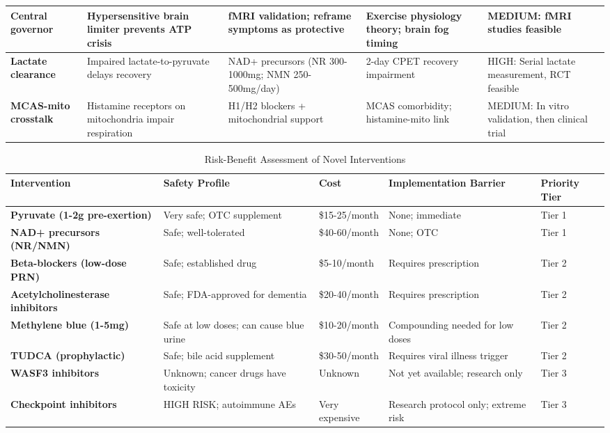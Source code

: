 \begin{table}[htbp]
\begin{tabular}{p{2.8cm}p{3cm}p{2.8cm}p{2.5cm}p{2.5cm}}
\midrule
\textbf{Central governor} & Hypersensitive brain limiter prevents ATP crisis & fMRI validation; reframe symptoms as protective & Exercise physiology theory; brain fog timing & MEDIUM: fMRI studies feasible \\
\midrule
\textbf{Lactate clearance} & Impaired lactate-to-pyruvate delays recovery & NAD+ precursors (NR 300-1000mg; NMN 250-500mg/day) & 2-day CPET recovery impairment & HIGH: Serial lactate measurement, RCT feasible \\
\midrule
\textbf{MCAS-mito crosstalk} & Histamine receptors on mitochondria impair respiration & H1/H2 blockers + mitochondrial support & MCAS comorbidity; histamine-mito link & MEDIUM: In vitro validation, then clinical trial \\
\bottomrule
\end{tabular}
\end{table}

\begin{table}[htbp]
\centering
\caption{Risk-Benefit Assessment of Novel Interventions}
\label{tab:novel-interventions-risk}
\small
\begin{tabular}{p{3.5cm}p{3cm}p{2.5cm}p{3cm}p{2.5cm}}
\toprule
\textbf{Intervention} & \textbf{Safety Profile} & \textbf{Cost} & \textbf{Implementation Barrier} & \textbf{Priority Tier} \\
\midrule
\textbf{Pyruvate (1-2g pre-exertion)} & Very safe; OTC supplement & \$15-25/month & None; immediate & Tier 1 \\
\midrule
\textbf{NAD+ precursors (NR/NMN)} & Safe; well-tolerated & \$40-60/month & None; OTC & Tier 1 \\
\midrule
\textbf{Beta-blockers (low-dose PRN)} & Safe; established drug & \$5-10/month & Requires prescription & Tier 2 \\
\midrule
\textbf{Acetylcholinesterase inhibitors} & Safe; FDA-approved for dementia & \$20-40/month & Requires prescription & Tier 2 \\
\midrule
\textbf{Methylene blue (1-5mg)} & Safe at low doses; can cause blue urine & \$10-20/month & Compounding needed for low doses & Tier 2 \\
\midrule
\textbf{TUDCA (prophylactic)} & Safe; bile acid supplement & \$30-50/month & Requires viral illness trigger & Tier 2 \\
\midrule
\textbf{WASF3 inhibitors} & Unknown; cancer drugs have toxicity & Unknown & Not yet available; research only & Tier 3 \\
\midrule
\textbf{Checkpoint inhibitors} & HIGH RISK; autoimmune AEs & Very expensive & Research protocol only; extreme risk & Tier 3 \\
\bottomrule
\end{tabular}
\end{table}


